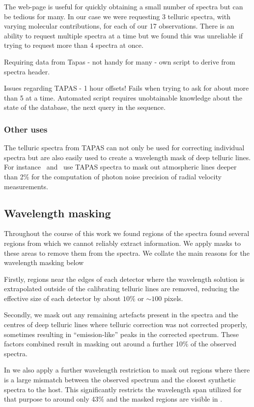 The web-page is useful for quickly obtaining a small number of spectra but can be tedious for many. In our case we were requesting 3 telluric spectra, with varying molecular contributions, for each of our 17 observations. There is an ability to request multiple spectra at a time but we found this was unreliable if trying to request more than 4 spectra at once.


Requiring data from Tapas
- not handy for many
- own script to derive from spectra header.

Issues regarding TAPAS - 1 hour offsets!
Fails when trying to ask for about more than 5 at a time.
Automated script requires unobtainable knowledge about the state of the database, the next query in the sequence.



\subsubsection{Other uses}
The telluric spectra from TAPAS can not only be used for correcting individual spectra but are also easily used to create a wavelength mask of deep telluric lines. For instance~\citet{figueira_radial_2016} and~\citet{artigau_optical_2018} use TAPAS spectra to mask out atmospheric lines deeper than 2\% for the computation of photon noise precision of radial velocity measurements.


\subsection{Wavelength masking}
Throughout the course of this work we found regions of the spectra found several regions from which we cannot reliably extract information.
We apply masks to these areas to remove them from the spectra. We collate the main reasons for the wavelength masking below

Firstly, regions near the edges of each detector where the wavelength solution is extrapolated outside of the calibrating telluric lines are removed, reducing the effective size of each detector by about \(10\%\) or \(\sim100\) pixels.

Secondly, we mask out any remaining artefacts present in the spectra and the centres of deep telluric lines where telluric correction was not corrected properly, sometimes resulting in ``emission-like'' peaks in the corrected spectrum. These factors combined result in masking out around a further 10\% of the observed spectra.

In  we also apply a further wavelength restriction to mask out regions where there is a large mismatch between the observed spectrum and the closest synthetic spectra to the host. This significantly restricts the wavelength span utilized for that purpose to around only 43\% and the masked regions are visible in .


